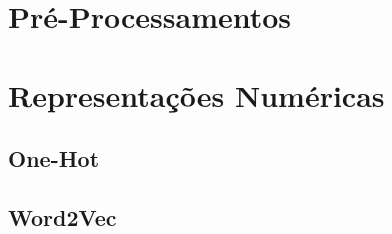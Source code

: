 \section{Pré-Processamentos}

\section{Representações Numéricas}

\subsection{One-Hot}

\subsection{Word2Vec} \label{sec:w2v}
